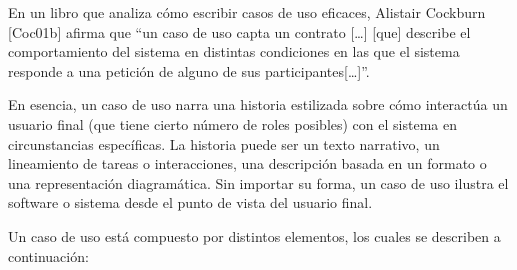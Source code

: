 En un libro que analiza cómo escribir casos de uso eficaces, Alistair Cockburn [Coc01b] afirma que “un caso de uso capta un contrato […] [que] describe el comportamiento del sistema en distintas condiciones en las que el sistema responde a una petición de alguno de sus participantes[…]”.

En esencia, un caso de uso narra una historia estilizada sobre cómo interactúa un usuario final (que tiene cierto número de roles posibles) con el sistema en circunstancias específicas. La historia puede ser un texto narrativo, un lineamiento de tareas o interacciones, una descripción basada en un formato o una representación diagramática. Sin importar su forma, un caso de uso ilustra el software o sistema desde el punto de vista del usuario final.

Un caso de uso está compuesto por distintos elementos, los cuales se describen a continuación:
